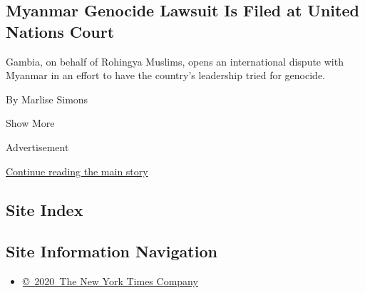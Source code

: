 \begin{enumerate}
  \hypertarget{myanmar-genocide-lawsuit-is-filed-at-united-nations-court}{%
  \subsection{Myanmar Genocide Lawsuit Is Filed at United Nations
  Court}\label{myanmar-genocide-lawsuit-is-filed-at-united-nations-court}}

  Gambia, on behalf of Rohingya Muslims, opens an international dispute
  with Myanmar in an effort to have the country's leadership tried for
  genocide.

  By Marlise Simons
\end{enumerate}

Show More

Advertisement

\protect\hyperlink{after-mid2}{Continue reading the main story}

\hypertarget{site-index}{%
\subsection{Site Index}\label{site-index}}

\hypertarget{site-information-navigation}{%
\subsection{Site Information
Navigation}\label{site-information-navigation}}

\begin{itemize}
\tightlist
\item
  \href{https://help.nytimes3xbfgragh.onion/hc/en-us/articles/115014792127-Copyright-notice}{©~2020~The
  New York Times Company}
\end{itemize}

